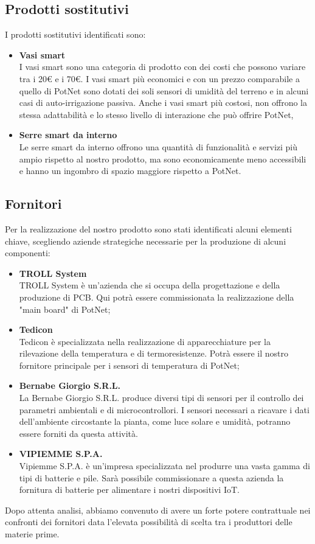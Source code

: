 \subsection{Prodotti sostitutivi}
I prodotti sostitutivi identificati sono:
\begin{itemize}
	\item \textbf{Vasi smart}\\
	I vasi smart sono una categoria di prodotto con dei costi che possono variare tra i 20€ e i 70€. I vasi smart più economici e con un prezzo comparabile a quello di PotNet sono dotati dei soli sensori di umidità del terreno e in alcuni casi di auto-irrigazione passiva. Anche i vasi smart più costosi, non offrono la stessa adattabilità e lo stesso livello di interazione che può offrire PotNet,
	\item \textbf{Serre smart da interno}\\
	Le serre smart da interno offrono una quantità di funzionalità e servizi più ampio rispetto al nostro prodotto, ma sono economicamente meno accessibili e hanno un ingombro di spazio maggiore rispetto a PotNet.
\end{itemize}

\subsection{Fornitori}
Per la realizzazione del nostro prodotto sono stati identificati alcuni elementi chiave, scegliendo aziende strategiche necessarie per la produzione di alcuni componenti:
\begin{itemize}
	\item \textbf{TROLL System}\\
	TROLL System è un’azienda che si occupa della progettazione e della produzione di PCB. Qui potrà essere commissionata la realizzazione della "main board" di PotNet;
	
	\item \textbf{Tedicon}\\
	Tedicon è specializzata nella realizzazione di apparecchiature per la rilevazione della temperatura e di termoresistenze. Potrà essere il nostro fornitore principale per i sensori di temperatura di PotNet;
	
	\item \textbf{Bernabe Giorgio S.R.L.}\\
	La Bernabe Giorgio S.R.L. produce diversi tipi di sensori per il controllo dei parametri ambientali e di microcontrollori. I sensori necessari a ricavare i dati dell’ambiente circostante la pianta, come luce solare e umidità, potranno essere forniti da questa attività.
	
	\item \textbf{VIPIEMME S.P.A.}\\
	Vipiemme S.P.A. è un’impresa specializzata nel produrre una vasta gamma di tipi di batterie e pile. Sarà possibile commissionare a questa azienda la fornitura di batterie per alimentare i nostri dispositivi IoT.
\end{itemize}
Dopo attenta analisi, abbiamo convenuto di avere un forte potere contrattuale nei confronti dei fornitori data l’elevata possibilità di scelta tra i produttori delle materie prime.